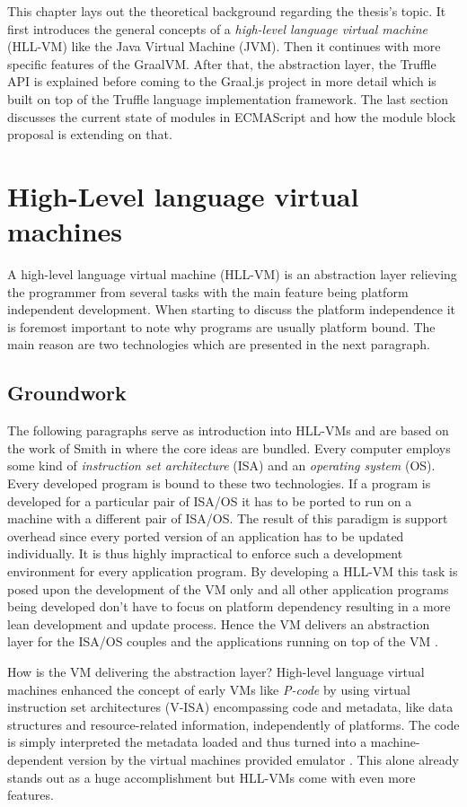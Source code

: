 This chapter lays out the theoretical background regarding the thesis's topic. It first introduces the general concepts of a \emph{high-level language virtual machine} (HLL-VM) like the Java Virtual Machine (JVM). Then it continues with more specific features of the GraalVM. After that, the abstraction layer, the Truffle API is explained before coming to the Graal.js project in more detail which is built on top of the Truffle language implementation framework. The last section discusses the current state of modules in ECMAScript and how the module block proposal is extending on that.

\section{High-Level language virtual machines}
A high-level language virtual machine (HLL-VM) is an abstraction layer relieving the programmer from several tasks with the main feature being platform independent development. When starting to discuss the platform independence it is foremost important to note why programs are usually platform bound. The main reason are two technologies which are presented in the next paragraph.

\subsection{Groundwork}
The following paragraphs serve as introduction into HLL-VMs and are based on the work of Smith in \cite{Smith} where the core ideas are bundled. Every computer employs some kind of \emph{instruction set architecture} (ISA) and an \emph{operating system} (OS). Every developed program is bound to these two technologies. If a program is developed for a particular pair of ISA/OS it has to be ported to run on a machine with a different pair of ISA/OS. The result of this paradigm is support overhead since every ported version of an application has to be updated individually. It is thus highly impractical to enforce such a development environment for every application program. By developing a HLL-VM this task is posed upon the development of the VM only and all other application programs being developed don't have to focus on platform dependency resulting in a more lean development and update process. Hence the VM delivers an abstraction layer for the ISA/OS couples and the applications running on top of the VM \cite{Smith}. 

How is the VM delivering the abstraction layer? High-level language virtual machines enhanced the concept of early VMs like \emph{P-code} \cite{pCode} by using virtual instruction set architectures (V-ISA) encompassing code and metadata, like data structures and resource-related information, independently of platforms. The code is simply interpreted the metadata loaded and thus turned into a machine-dependent version by the virtual machines provided emulator \cite{Smith}. This alone already stands out as a huge accomplishment but HLL-VMs come with even more features.


